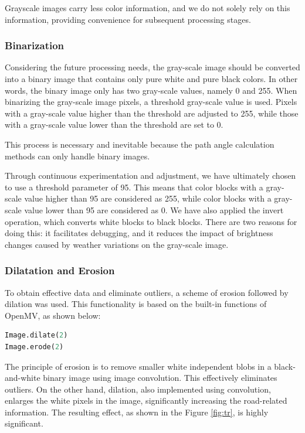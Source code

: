 \documentclass[12pt, a4paper, oneside]{report}
\begin{document}
Grayscale images carry less color information, and we do not solely rely on this information, providing convenience for subsequent processing stages.
    
\subsubsection*{Binarization}
Considering the future processing needs, the gray-scale image should be converted into a binary image that contains only pure white and pure black colors. In other words, the binary image only has two gray-scale values, namely 0 and 255. When binarizing the gray-scale image pixels, a threshold gray-scale value is used. Pixels with a gray-scale value higher than the threshold are adjusted to 255, while those with a gray-scale value lower than the threshold are set to 0.

This process is necessary and inevitable because the path angle calculation methods can only handle binary images.

Through continuous experimentation and adjustment, we have ultimately chosen to use a threshold parameter of 95. This means that color blocks with a gray-scale value higher than 95 are considered as 255, while color blocks with a gray-scale value lower than 95 are considered as 0. We have also applied the invert operation, which converts white blocks to black blocks. There are two reasons for doing this: it facilitates debugging, and it reduces the impact of brightness changes caused by weather variations on the gray-scale image.

\subsubsection{Dilatation and Erosion}
To obtain effective data and eliminate outliers, a scheme of erosion followed by dilation was used. This functionality is based on the built-in functions of OpenMV, as shown below:

\begin{lstlisting}[language=Python]
Image.dilate(2)
Image.erode(2)
\end{lstlisting}

The principle of erosion is to remove smaller white independent blobs in a black-and-white binary image using image convolution. This effectively eliminates outliers. On the other hand, dilation, also implemented using convolution, enlarges the white pixels in the image, significantly increasing the road-related information. The resulting effect, as shown in the Figure \ref{fig:tr}, is highly significant.
\end{document}
